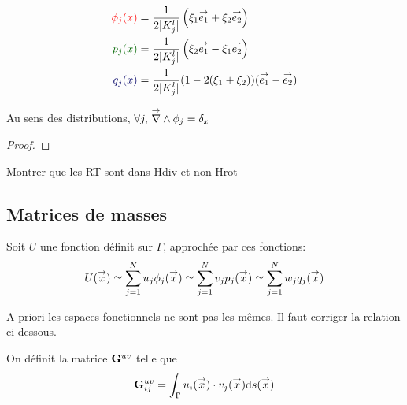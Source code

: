     \begin{minipage}{0.53\textwidth}
      \centering
      \begin{tikzpicture}[scale=2.5]
        
      \end{tikzpicture}
    \end{minipage}
    \begin{minipage}{0.45\textwidth}
      \begin{align*}
        \color{red}{\phi_j(x)} &= \frac{1}{2|K_j^l|}\left(\xi_1 \vect{e_1} + \xi_2 \vect{e_2}\right)\\
        \color{black!60!green}{p_j(x)} &= \frac{1}{2|K_j^l|}\left(\xi_2 \vect{e_1} -\xi_1 \vect{e_2}\right)\\
        \color{black!60!blue}{q_j(x)} &= \frac{1}{2|K_j^l|}(1-2(\xi_1+\xi_2))(\vect{e_1} -\vect{e_2})
      \end{align*}
    \end{minipage}

    \begin{prop}
      Au sens des distributions, \(\forall j,\, \vrot \phi_j = \delta_x\)
    \end{prop}
    \begin{proof}
    \end{proof}

    \begin{TODO}
      Montrer que les RT sont dans Hdiv et non Hrot
    \end{TODO}

  \subsection{Matrices de masses}
    Soit \(U\) une fonction définit sur \(\Gamma\), approchée par ces fonctions: 
    \[ U(\vx) \simeq \sum\limits_{j=1}^N u_j \phi_j(\vx) \simeq \sum\limits_{j=1}^N v_j p_j(\vx) \simeq \sum\limits_{j=1}^N w_j q_j(\vx)
    \]

    \begin{TODO}
      A priori les espaces fonctionnels ne sont pas les mêmes. Il faut corriger la relation ci-dessous.
    \end{TODO}

    \begin{defn}
      On définit la matrice \(\mG{u}{v}\) telle que
      \begin{equation}
        \mG{u}{v}_{ij} = \int_\Gamma u_i(\vx)\cdot v_j(\vx) \dd{s}(\vx)
      \end{equation}
    \end{defn}

